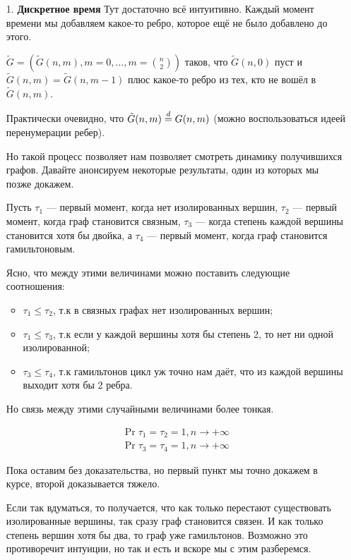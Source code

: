 \begin{itemize}
  \item[1.] \textbf{Дискретное время}
  Тут достаточно всё интуитивно. Каждый момент времени мы добавляем какое-то
  ребро, которое ещё не было добавлено до этого.
  \begin{definition}
    $\tilde{G} = (\tilde{G}(n, m), m = 0, \ldots,
    m = \binom{n}{2})$ таков, что $\tilde{G}(n, 0)$ пуст и 
    $\tilde{G}(n, m) = \tilde{G}(n, m - 1)$ плюс какое-то ребро из тех, кто не вошёл
    в $\tilde{G}(n, m)$.
  \end{definition}

  Практически очевидно, что $\tilde{G}(n, m) \overset{d}{=} G(n, m)$ (можно воспользоваться
  идеей перенумерации ребер).

  Но такой процесс позволяет нам позволяет смотреть динамику получившихся графов.
  Давайте анонсируем некоторые результаты, один из которых мы позже докажем.

  Пусть $\tau_1$ --- первый момент, когда нет изолированных вершин, $\tau_2$ ---
  первый момент, когда граф становится связным, $\tau_3$ --- когда степень каждой
  вершины
  становится хотя бы двойка, а $\tau_4$ --- первый момент, когда граф становится
  гамильтоновым.

  Ясно, что между этими величинами можно поставить следующие соотношения:
  \begin{itemize}
    \item $\tau_1 \leq \tau_2$, т.к в связных графах нет изолированных вершин;
    \item $\tau_1 \leq \tau_3$, т.к если у каждой вершины хотя бы степень 2, то нет ни одной изолированной;
    \item $\tau_3 \leq \tau_4$, т.к гамильтонов цикл уж точно нам даёт, что из 
    каждой вершины выходит хотя бы 2 ребра.
  \end{itemize}
  Но связь между этими случайными величинами более тонкая.
  \begin{theorem}
    \begin{align}
      \Pr{\tau_1 = \tau_2} = 1, n \to +\infty\\
      \Pr{\tau_3 = \tau_4} = 1, n \to +\infty
    \end{align}
  \end{theorem}

  Пока оставим без доказательства, но первый пункт мы точно докажем в курсе, второй
  доказывается тяжело.

  Если так вдуматься, то получается, что как только перестают существовать изолированные
  вершины, так сразу граф становится связен. И как только степень вершин хотя бы
  два, то граф уже гамильтонов. Возможно это противоречит интуиции, но так и есть и 
  вскоре мы с этим разберемся.


\end{itemize}
